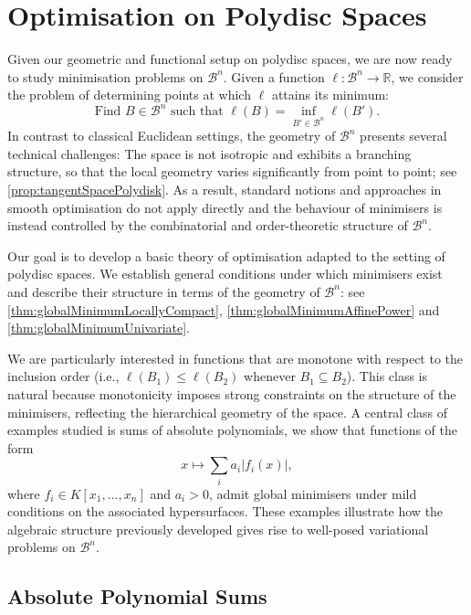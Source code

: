 \documentclass[10pt]{article}
\theoremstyle{definition}
\begin{document}
\section{Optimisation on Polydisc Spaces}

\label{sec:optimisation}
Given our geometric and functional setup on polydisc spaces, we are now ready to study minimisation problems on $\mathcal{B}^n$. Given a function $\ell\colon\mathcal{B}^n \to \mathbb{R}$, we consider the problem of determining points at which $\ell$ attains its minimum:
\begin{equation*}
  \text{Find }B \in \mathcal{B}^n\text{ such that }\ell(B) = \inf_{B' \in \mathcal{B}^n} \ell(B').
\end{equation*}
In contrast to classical Euclidean settings, the geometry of $\mathcal{B}^n$ presents several technical challenges: The space is not isotropic and exhibits a branching structure, so that the local geometry varies significantly from point to point; see \cref{prop:tangentSpacePolydisk}.  As a result, standard notions and approaches in smooth optimisation do not apply directly and the behaviour of minimisers is instead controlled by the combinatorial and order-theoretic structure of $\mathcal{B}^n$.

Our goal is to develop a basic theory of optimisation adapted to the setting of polydisc spaces. We establish general conditions under which minimisers exist and describe their structure in terms of the geometry of $\mathcal{B}^n$: see \cref{thm:globalMinimumLocallyCompact}, \cref{thm:globalMinimumAffinePower} and \cref{thm:globalMinimumUnivariate}.

We are particularly interested in functions that are monotone with respect to the inclusion order (i.e., $\ell(B_1) \le \ell(B_2)$ whenever $B_1 \subseteq B_2$). This class is natural because monotonicity imposes strong constraints on the structure of the minimisers, reflecting the hierarchical geometry of the space. A central class of examples studied is sums of absolute polynomials, we show that functions of the form
$$
x \mapsto \sum_i a_i |f_i(x)|,
$$
where $f_i \in K[x_1, \ldots, x_n]$ and $a_i > 0$, admit global minimisers under mild conditions on the associated hypersurfaces. These examples illustrate how the algebraic structure previously developed gives rise to well-posed variational problems on $\mathcal{B}^n$.

\subsection{Absolute Polynomial Sums}
\end{document}

